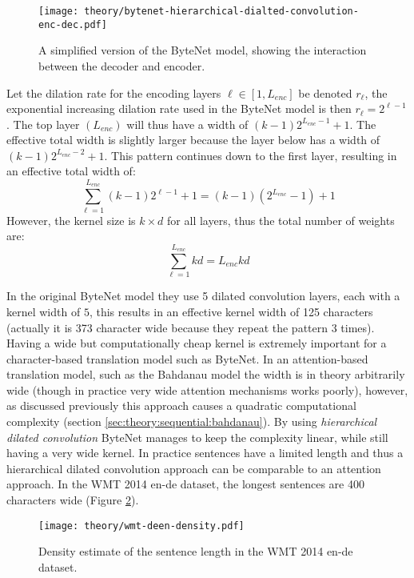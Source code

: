 \begin{figure}[h]
    \centering
    \texttt{[image: theory/bytenet-hierarchical-dialted-convolution-enc-dec.pdf]}
    \caption{A simplified version of the ByteNet model, showing the interaction between the decoder and encoder.}
    \label{fig:bytenet:simplified-hdc}
\end{figure}

Let the dilation rate for the encoding layers $\ell \in [1, L_{enc}]$ be denoted $r_\ell$, the exponential increasing dilation rate used in the ByteNet model is then $r_\ell = 2^{\ell - 1}$. The top layer $(L_{enc})$ will thus have a width of $(k-1) 2^{L_{enc} -1} + 1$. The effective total width is slightly larger because the layer below has a width of $(k-1) 2^{L_{enc} - 2} + 1$. This pattern continues down to the first layer, resulting in an effective total width of:
\begin{equation}
\sum_{\ell = 1}^{L_{enc}} (k - 1) 2^{\ell-1} + 1 = (k - 1) (2^{L_{enc}} - 1) + 1
\end{equation}
However, the kernel size is $k \times d$ for all layers, thus the total number of weights are:
\begin{equation}
\sum_{\ell = 1}^{L_{enc}} k d = L_{enc} k d
\end{equation}

In the original ByteNet model they use 5 dilated convolution layers, each with a kernel width of $5$, this results in an effective kernel width of 125 characters (actually it is 373 character wide because they repeat the pattern 3 times). Having a wide but computationally cheap kernel is extremely important for a character-based translation model such as ByteNet. In an attention-based translation model, such as the Bahdanau model \cite{bahdanau-2015-nmt} the width is in theory arbitrarily wide (though in practice very wide attention mechanisms works poorly), however, as discussed previously this approach causes a quadratic computational complexity (section \ref{sec:theory:sequential:bahdanau}). By using \textit{hierarchical dilated convolution} ByteNet manages to keep the complexity linear, while still having a very wide kernel. In practice sentences have a limited length and thus a hierarchical dilated convolution approach can be comparable to an attention approach. In the WMT 2014 en-de dataset, the longest sentences are 400 characters wide (Figure \ref{fig:bytenet:wmt-deen-density}).

\begin{figure}[h]
    \centering
    \texttt{[image: theory/wmt-deen-density.pdf]}
    \caption{Density estimate of the sentence length in the WMT 2014 en-de dataset.}
    \label{fig:bytenet:wmt-deen-density}
\end{figure}

